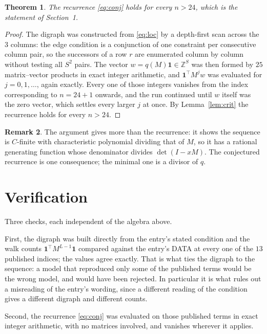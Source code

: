 \documentclass[11pt,a4paper]{article}
\theoremstyle{plain}
\newtheorem{theorem}{Theorem}
\theoremstyle{definition}
\newtheorem{remark}[theorem]{Remark}
\begin{document}
\begin{theorem}
The recurrence \eqref{eq:conj} holds for every $n>24$, which is the statement of
Section~1.
\end{theorem}

\begin{proof}
The digraph was constructed from \eqref{eq:loc} by a depth-first scan across the $3$
columns: the edge condition is a conjunction of one constraint per consecutive column
pair, so the successors of a row $r$ are enumerated column by column without testing all
$S^2$ pairs. The vector $w=q(M)\mathbf{1}\in\mathbb{Z}^{S}$ was then formed by $25$
matrix--vector products in exact integer arithmetic, and $\mathbf{1}^{\!\top}M^{j}w$ was
evaluated for $j=0,1,\dots$, again exactly. Every one of those integers vanishes from the
index corresponding to $n=24+1$ onwards, and the run continued until $w$ itself was the
zero vector, which settles every larger $j$ at once. By Lemma~\ref{lem:crit} the recurrence
holds for every $n>24$.
\end{proof}

\begin{remark}
The argument gives more than the recurrence: it shows the sequence is $C$-finite with
characteristic polynomial dividing that of $M$, so it has a rational generating function
whose denominator divides $\det(I-xM)$. The conjectured recurrence is one consequence; the
minimal one is a divisor of $q$.
\end{remark}

\section{Verification}

Three checks, each independent of the algebra above.

First, the digraph was built directly from the entry's stated condition and the walk counts
$\mathbf{1}^{\!\top}M^{L-1}\mathbf{1}$ compared against the entry's DATA at
every one of the $13$ published indices; the values agree exactly. That is what ties
the digraph to the sequence: a model that reproduced only some of the published terms would
be the wrong model, and would have been rejected. In particular it is what rules out a
misreading of the entry's wording, since a different reading of the condition gives a
different digraph and different counts.

Second, the recurrence \eqref{eq:conj} was evaluated on those published terms in exact
integer arithmetic, with no matrices involved, and vanishes wherever it applies.
\end{document}
